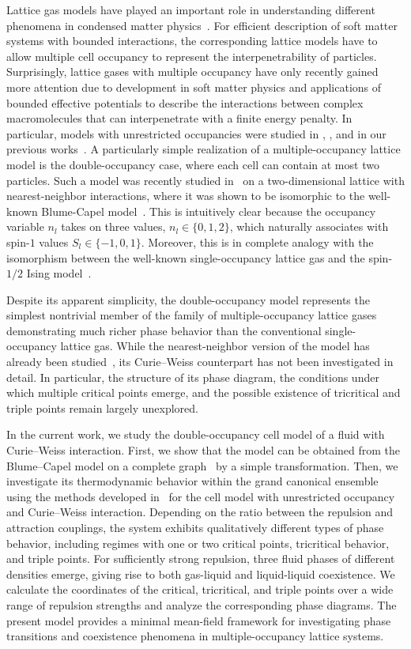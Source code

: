 \documentclass[pdflatex,sn-mathphys-num]{sn-jnl}%
\theoremstyle{thmstyleone}%
\theoremstyle{thmstyletwo}%
\theoremstyle{thmstylethree}%
\begin{document}
	Lattice gas models have played an important role in understanding different phenomena in condensed matter physics~\cite{Baxter82,FriedliVelenik17}. For efficient description of soft matter systems with bounded interactions, the corresponding lattice models have to allow multiple cell occupancy to represent the interpenetrability of particles. Surprisingly, lattice gases with multiple occupancy have only recently gained more attention due to development in soft matter physics and applications of bounded effective potentials to describe the interactions between complex macromolecules that can interpenetrate with a finite energy penalty. In particular, models with unrestricted occupancies were studied in \cite{FHL04}, \cite{FL18,FL20}, and in our previous works~\cite{KKD20,KD22,RDKPS26a}. A particularly simple realization of a multiple-occupancy lattice model is the double-occupancy case, where each cell can contain at most two particles. Such a model was recently studied in~\cite{LYZ21} on a two-dimensional lattice with nearest-neighbor interactions, where it was shown to be isomorphic to the well-known Blume-Capel model~\cite{Blume66,Capel66}. This is intuitively clear because the occupancy variable $n_l$ takes on three values, $n_l\in\{0,1,2\}$, which naturally associates with spin-$1$ values $S_l\in\{-1,0,1\}$.
	Moreover, this is in complete analogy with the isomorphism between the well-known single-occupancy lattice gas and the spin-$1/2$ Ising model~\cite{LY52}.
	
	Despite its apparent simplicity, the double-occupancy model represents the simplest nontrivial member of the family of multiple-occupancy lattice gases demonstrating much richer phase behavior than the conventional single-occupancy lattice gas. While the nearest-neighbor version of the model has already been studied~\cite{LYZ21}, its Curie--Weiss counterpart has not been investigated in detail. In particular, the structure of its phase diagram, the conditions under which multiple critical points emerge, and the possible existence of tricritical and triple points remain largely unexplored.
	
	In the current work, we study the double-occupancy cell model of a fluid with Curie--Weiss interaction. First, we show that the model can be obtained from the Blume--Capel model on a complete graph~\cite{HKBHK25} by a simple transformation. Then, we investigate its thermodynamic behavior within the grand canonical ensemble using the methods developed in~\cite{KKD20,KD22,RDKPS26a} for the cell model with unrestricted occupancy and Curie--Weiss interaction. Depending on the ratio between the repulsion and attraction couplings, the system exhibits qualitatively different types of phase behavior, including regimes with one or two critical points, tricritical behavior, and triple points. For sufficiently strong repulsion, three fluid phases of different densities emerge, giving rise to both gas-liquid and liquid-liquid coexistence. We calculate the coordinates of the critical, tricritical, and triple points over a wide range of repulsion strengths and analyze the corresponding phase diagrams. The present model provides a minimal mean-field framework for investigating phase transitions and coexistence phenomena in multiple-occupancy lattice systems.
	
\end{document}
